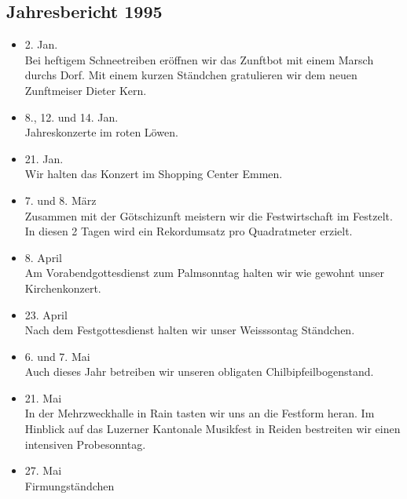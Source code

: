 \subsection{Jahresbericht 1995}

\begin{history}


    \begin{itemize}

        \item[]2. Jan.\\
        Bei heftigem Schneetreiben eröffnen wir das Zunftbot mit einem Marsch
        durchs Dorf. Mit einem kurzen Ständchen gratulieren wir dem neuen
        Zunftmeiser Dieter Kern.

        \item[]8., 12. und 14. Jan.\\
        Jahreskonzerte im roten Löwen.

        \item[]21. Jan.\\
        Wir halten das Konzert im Shopping Center Emmen.

        \item[]7. und 8. März\\
        Zusammen mit der Götschizunft meistern wir die Festwirtschaft im
        Festzelt. In diesen 2 Tagen wird ein Rekordumsatz pro Quadratmeter
        erzielt.

        \item[]8. April\\
        Am Vorabendgottesdienst zum Palmsonntag halten wir wie gewohnt unser
        Kirchenkonzert.

        \item[]23. April\\
        Nach dem Festgottesdienst halten wir unser Weisssontag Ständchen.

        \item[]6. und 7. Mai\\
        Auch dieses Jahr betreiben wir unseren obligaten Chilbipfeilbogenstand.

        \item[]21. Mai\\
        In der Mehrzweckhalle in Rain tasten wir uns an die Festform heran. Im
        Hinblick auf das Luzerner Kantonale Musikfest in Reiden bestreiten wir
        einen intensiven Probesonntag.

        \item[]27. Mai\\
        Firmungständchen


\end{itemize}
\end{history}
